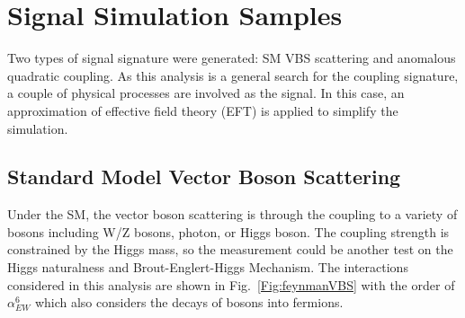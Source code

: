 \section{Signal Simulation Samples}
Two types of signal signature were generated: SM VBS scattering and anomalous quadratic coupling. As this analysis is a general search for the coupling signature, a couple of physical processes are involved as the signal. In this case, an approximation of effective field theory (EFT) is applied to simplify the simulation. 

\subsection{Standard Model Vector Boson Scattering}
Under the SM, the vector boson scattering is through the coupling to a variety of bosons including W/Z bosons, photon, or Higgs boson. The coupling strength is constrained by the Higgs mass, so the measurement could be another test on the Higgs naturalness and  Brout-Englert-Higgs Mechanism\cite{PhysRevD.7.3111}. The interactions considered in this analysis are shown in Fig.~\ref{Fig:feynmanVBS}  with the order of $\alpha_{EW}^6$ which also considers the decays of bosons into fermions. 

